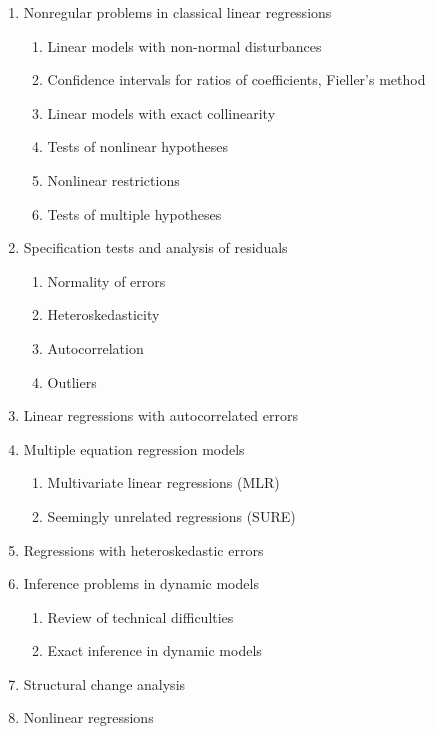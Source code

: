 \documentclass[titlepage,11pt,amstex]{article}
\begin{document}
\begin{enumerate}
\item Nonregular problems in classical linear regressions

\begin{enumerate}
\item Linear models with non-normal disturbances

\item Confidence intervals for ratios of coefficients, Fieller's method

\item Linear models with exact collinearity

\item Tests of nonlinear hypotheses

\item Nonlinear restrictions

\item Tests of multiple hypotheses
\end{enumerate}

\item Specification tests and analysis of residuals

\begin{enumerate}
\item Normality of errors

\item Heteroskedasticity

\item Autocorrelation

\item Outliers
\end{enumerate}

\item Linear regressions with autocorrelated errors

\item Multiple equation regression models

\begin{enumerate}
\item Multivariate linear regressions (MLR)

\item Seemingly unrelated regressions (SURE)
\end{enumerate}

\item Regressions with heteroskedastic errors

\item Inference problems in dynamic models

\begin{enumerate}
\item Review of technical difficulties

\item Exact inference in dynamic models
\end{enumerate}

\item Structural change analysis

\item Nonlinear regressions
\end{enumerate}
\end{document}
